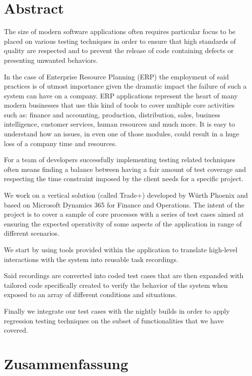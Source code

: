 \chapter*{Abstract} 

The size of modern software applications often requires particular focus to be placed on various testing techniques in order to ensure that high standards of quality are respected and to prevent the release of code containing defects or presenting unwanted behaviors.

In the case of Enterprise Resource Planning (ERP) the employment of said practices is of utmost importance given the dramatic impact the failure of such a system can have on a company. ERP applications represent the heart of many modern businesses that use this kind of tools to cover multiple core activities such as: finance and accounting, production, distribution, sales, business intelligence, customer services, human resources and much more. It is easy to understand how an issues, in even one of those modules, could result in a huge loss of a company time and resources.

For a team of developers successfully implementing testing related techniques often means finding a balance between having a fair amount of test coverage and respecting the time constraint imposed by the client needs for a specific project.

We work on a vertical solution (called Trade+) developed by Würth Phoenix and based on Microsoft Dynamics 365 for Finance and Operations. The intent of the project is to cover a sample of core processes with a series of test cases aimed at ensuring the expected operativity of some aspects of the application in range of different scenarios. 

We start by using tools provided within the application to translate high-level interactions with the system into reusable task recordings. 

Said recordings are converted into coded test cases that are then expanded with tailored code specifically created to verify the behavior of the system when exposed to an array of different conditions and situations.

Finally we integrate our test cases with the nightly builds in order to apply regression testing techniques on the subset of functionalities that we have covered.

\chapter*{Zusammenfassung}

